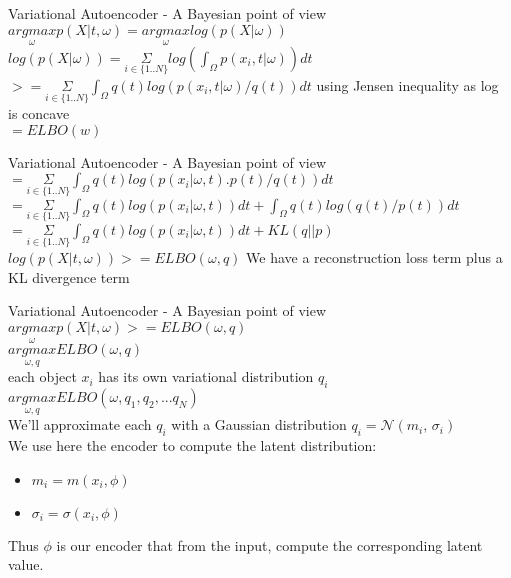 \documentclass{beamer}
\begin{document}
\begin{frame}{Variational Autoencoder - A Bayesian point of view}
	$\underset{\omega}{argmax} p(X|t, \omega) = \underset{\omega}{argmax} log(p(X| \omega))$ \\
	$ log(p(X| \omega)) = \underset{i \in \{1..N\}}{\Sigma} log( \int_\Omega p(x_i, t | \omega))dt$ \\ 
	$ >= \underset{i \in \{1..N\}}{\Sigma} \int_\Omega q(t) log( p(x_i, t | \omega)/q(t))dt$ using Jensen inequality as log is concave\\
	$ = ELBO(w)$ \\
\end{frame}
\begin{frame}{Variational Autoencoder - A Bayesian point of view}
	$ = \underset{i \in \{1..N\}}{\Sigma} \int_\Omega q(t) log( p(x_i | \omega, t).p(t)/q(t))dt$ \\
	$ = \underset{i \in \{1..N\}}{\Sigma} \int_\Omega q(t) log( p(x_i | \omega, t))dt + \int_\Omega q(t)log(q(t)/p(t)) dt$ \\
	$ = \underset{i \in \{1..N\}}{\Sigma} \int_\Omega q(t) log( p(x_i | \omega, t))dt + KL( q || p) $ \\
	$ log(p(X|t, \omega)) >= ELBO(\omega,q) $
	We have a reconstruction loss term plus a KL divergence term
\end{frame}

\begin{frame}{Variational Autoencoder - A Bayesian point of view}
	$ \underset{\omega}{argmax} p(X|t, \omega) >= ELBO(\omega,q) $ \\
        $ \underset{\omega,q}{argmax} ELBO(\omega,q) $ \\
	each object $x_i$ has its own variational distribution $q_i$ \\
        $ \underset{\omega,q}{argmax} ELBO(\omega,q_1, q_2, ... q_N) $ \\
	We'll approximate each $q_i$ with a Gaussian distribution $q_i = \mathcal{N}(m_i,\,\sigma_i)$ \\
	We use here the encoder to compute the latent distribution: \\
	\begin{itemize}
		\item $m_i = m(x_i, \phi)$
		\item $\sigma_i = \sigma(x_i, \phi)$
	\end{itemize}
	Thus $\phi$ is our encoder that from the input, compute the corresponding latent value.
\end{frame}
\end{document}
